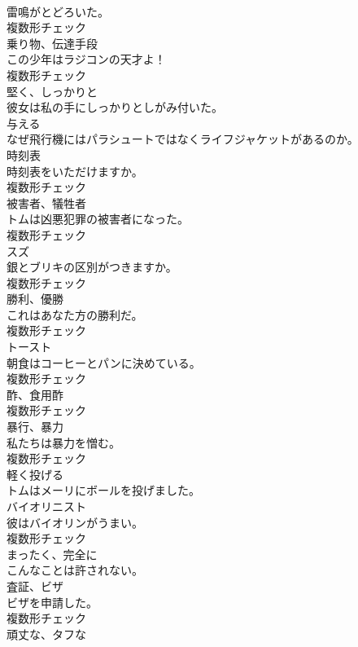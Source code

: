 \documentclass[8pt]{extreport}
\begin{document}
\begin{CJK}{UTF8}{min}
\\	雷鳴がとどろいた。	
\\	複数形チェック
\\	[名詞]	乗り物、伝達手段	
\\	この少年はラジコンの天才よ！	
\\	複数形チェック
\\	[副詞]	堅く、しっかりと	
\\	彼女は私の手にしっかりとしがみ付いた。	
\\	[動詞]	与える	
\\	なぜ飛行機にはパラシュートではなくライフジャケットがあるのか。	
\\	[名詞]	時刻表	
\\	時刻表をいただけますか。	
\\	複数形チェック
\\	[名詞]	被害者、犠牲者	
\\	トムは凶悪犯罪の被害者になった。	
\\	複数形チェック
\\	[名詞]	スズ	
\\	銀とブリキの区別がつきますか。	
\\	複数形チェック
\\	[名詞]	勝利、優勝	
\\	これはあなた方の勝利だ。	
\\	複数形チェック
\\	[名詞]	トースト	
\\	朝食はコーヒーとパンに決めている。	
\\	複数形チェック
\\	[名詞]	酢、食用酢	
\\	複数形チェック
\\	[名詞]	暴行、暴力	
\\	私たちは暴力を憎む。	
\\	複数形チェック
\\	[動詞]	軽く投げる	
\\	トムはメーリにボールを投げました。	
\\	[名詞]	バイオリニスト	
\\	彼はバイオリンがうまい。	
\\	複数形チェック
\\	[副詞]	まったく、完全に	
\\	こんなことは許されない。	
\\	[名詞]	査証、ビザ	
\\	ビザを申請した。	
\\	複数形チェック
\\	[形容詞]	頑丈な、タフな	

\end{CJK}
\end{document}
